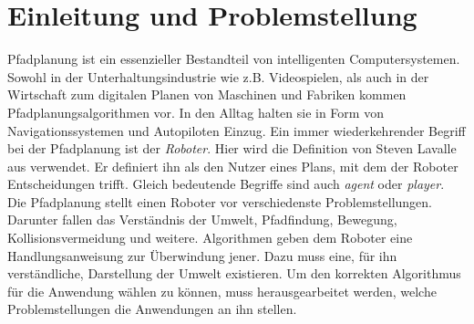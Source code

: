 
\chapter{Einleitung und Problemstellung}
 
Pfadplanung ist ein essenzieller Bestandteil von intelligenten Computersystemen. 
Sowohl in der Unterhaltungsindustrie wie z.B. Videospielen, als auch in der Wirtschaft zum digitalen Planen von Maschinen und Fabriken kommen Pfadplanungsalgorithmen vor. 
In den Alltag halten sie in Form von Navigationssystemen und Autopiloten Einzug.
Ein immer wiederkehrender Begriff bei der Pfadplanung ist der \textit{Roboter}. 
Hier wird die Definition von Steven Lavalle aus \cite[S. 4]{Lav06} verwendet.
Er definiert ihn als den Nutzer eines Plans, mit dem der Roboter Entscheidungen trifft. 
Gleich bedeutende Begriffe sind auch \textit{agent} oder \textit{player}. 
Die Pfadplanung stellt einen Roboter vor verschiedenste Problemstellungen.
Darunter fallen das Verständnis der Umwelt, Pfadfindung, Bewegung, Kollisionsvermeidung und weitere. 
Algorithmen geben dem Roboter eine Handlungsanweisung zur Überwindung jener.
Dazu muss eine, für ihn verständliche, Darstellung der Umwelt existieren.
Um den korrekten Algorithmus für die Anwendung wählen zu können, muss herausgearbeitet werden, welche Problemstellungen die Anwendungen an ihn stellen. 

